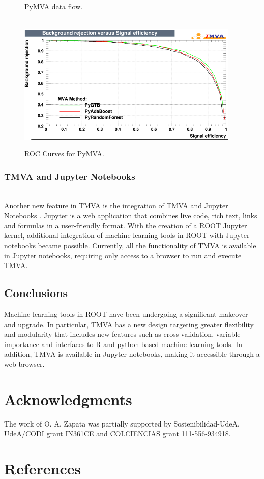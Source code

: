 \documentclass[a4paper]{jpconf}
\begin{document}
\begin{figure}[h]
\begin{minipage}{15pc}
\vspace{6pc}%
\caption{\label{pymvadf}PyMVA data flow. }
\end{minipage}\hspace{2pc}%
\vspace{2pc}
\hspace*{\fill} \\
\includegraphics[width=25pc]{img/pymvaroc.png}\caption{\label{pymvaroc} ROC Curves for PyMVA.}
\end{figure}


\subsubsection{TMVA and Jupyter Notebooks}\hspace*{\fill} \\
Another new feature in TMVA is the integration of TMVA and Jupyter Notebooks \cite{PER-GRA:2007}. Jupyter is a web application that combines live code, rich text, links and formulas in a user-friendly format. With the creation of a ROOT Jupyter kernel, additional integration of machine-learning tools in ROOT with Jupyter notebooks became possible. Currently, all the functionality of TMVA is available in Jupyter notebooks, requiring only access to a browser to run and execute TMVA.



\subsection{Conclusions}
Machine learning tools in ROOT have been undergoing a significant makeover and upgrade. In particular, TMVA has a new design targeting greater flexibility and modularity that includes new features such as cross-validation, variable importance and interfaces to R and python-based machine-learning tools. In addition, TMVA is available in Jupyter notebooks, making it accessible through a web browser.



\section*{Acknowledgments}
The work of O. A. Zapata was partially supported by Sostenibilidad-UdeA, UdeA/CODI grant IN361CE and COLCIENCIAS grant 111-556-934918.\newline


\section*{References}


\end{document}
